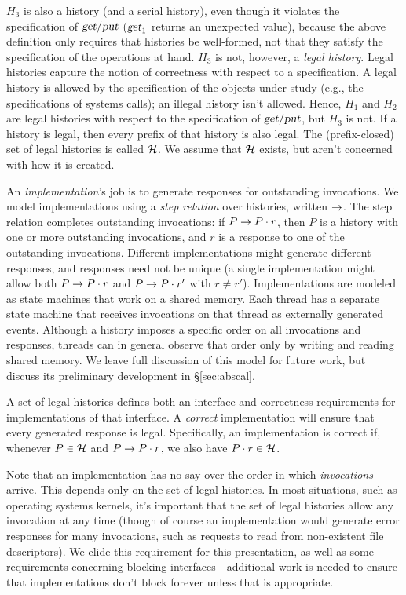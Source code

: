 $H_3$ is also a history (and a serial history), even though it violates
the specification of $\textsl{get}\slash\textsl{put}$ ($\textsl{get}_1$ returns an
unexpected value), because the above definition only requires that
histories be well-formed, not that they satisfy the specification of the
operations at hand.  $H_3$ is not, however, a \emph{legal history}.
Legal histories capture the notion of correctness with respect to
a specification.  A legal history is allowed by the
specification of the objects under study (e.g., the specifications
of systems calls); an illegal history isn't
allowed.  Hence, $H_1$ and $H_2$ are legal histories with respect to the
specification of $\textsl{get}\slash\textsl{put}$, but $H_3$ is not.
If a history is legal, then every prefix of that history is
also legal. The (prefix-closed) set of legal histories is called
$\mathcal{H}$.
We assume that $\mathcal{H}$ exists, but aren't
concerned with how it is created.

An \emph{implementation}'s job is to generate responses for outstanding
invocations.
%
We model implementations using a \emph{step relation} over histories,
written $\rightarrow$.
%
The step relation completes outstanding invocations: if $P \rightarrow P\cdot
r$, then $P$ is a history with one or more outstanding invocations, and
$r$ is a response to one of the outstanding invocations.
%
Different implementations might generate different responses, and
responses need not be unique (a single implementation might allow both
$P \rightarrow P\cdot r$ and $P \rightarrow P\cdot r'$ with $r \neq r'$).
%
Implementations are modeled as state machines that work on a shared
memory.
%
Each thread has a separate state machine that receives invocations on
that thread as externally generated events.
%
Although a history imposes a specific order on all invocations and
responses, threads can in general observe that order only by
writing and reading shared memory.
%
We leave full discussion of this model for future work, but
discuss its preliminary development in \S\ref{sec:abscal}.

A set of legal histories defines both an interface and correctness
requirements for implementations of that interface.
%
A \emph{correct} implementation will ensure that every generated response is
legal.
%
Specifically, an implementation is correct if, whenever $P \in
\mathcal{H}$ and  $P \rightarrow P\cdot r$, we also have $P\cdot r \in
\mathcal{H}$.

Note that an implementation has no say over the order in which
\emph{invocations} arrive.
%
This depends only on the set of legal histories.
%
In most situations, such as operating systems kernels, it's important
that the set of legal histories allow any invocation at any time (though
of course an implementation would generate error responses for many
invocations, such as requests to read from non-existent file
descriptors).
%
We elide this requirement for this presentation, as well as some requirements concerning blocking
interfaces---additional work is needed to ensure that implementations
don't block forever unless that is appropriate.


